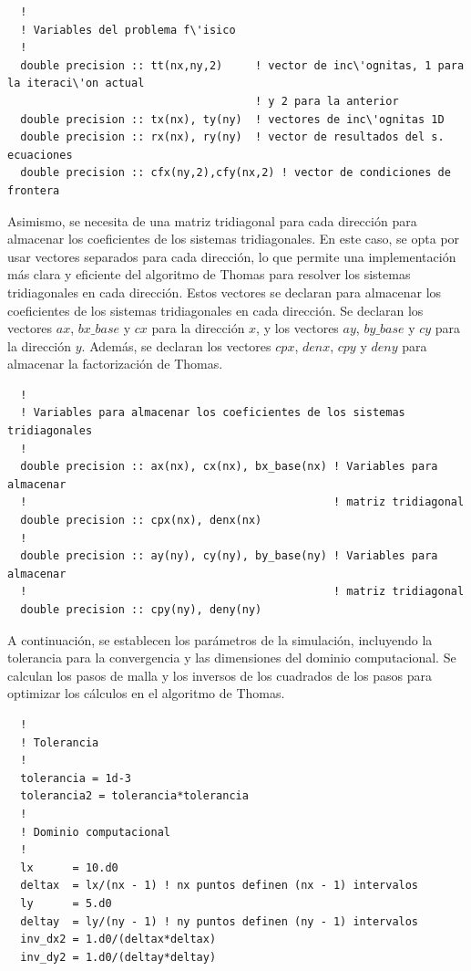 \documentclass[11pt,a4paper]{article}
\begin{document}
\begin{verbatim}
  !
  ! Variables del problema f\'isico
  !
  double precision :: tt(nx,ny,2)     ! vector de inc\'ognitas, 1 para la iteraci\'on actual 
                                      ! y 2 para la anterior
  double precision :: tx(nx), ty(ny)  ! vectores de inc\'ognitas 1D
  double precision :: rx(nx), ry(ny)  ! vector de resultados del s. ecuaciones
  double precision :: cfx(ny,2),cfy(nx,2) ! vector de condiciones de frontera
\end{verbatim}

Asimismo, se necesita de una matriz tridiagonal para cada direcci\'on
para almacenar los coeficientes de los sistemas tridiagonales. En este caso, se opta por usar 
vectores separados para cada dirección, lo que permite una implementación más 
clara y eficiente del algoritmo de Thomas para resolver los sistemas 
tridiagonales en cada dirección. Estos vectores se declaran para
almacenar los coeficientes de los sistemas tridiagonales en cada dirección. 
Se declaran los vectores $ax$, $bx\_base$ y $cx$ para la dirección $x$, y los 
vectores $ay$, $by\_base$ y $cy$ para la dirección $y$. Además, se declaran los 
vectores $cpx$, $denx$, $cpy$ y $deny$ para almacenar la factorización de Thomas.

\begin{verbatim}
  !
  ! Variables para almacenar los coeficientes de los sistemas tridiagonales
  !
  double precision :: ax(nx), cx(nx), bx_base(nx) ! Variables para almacenar
  !                                               ! matriz tridiagonal
  double precision :: cpx(nx), denx(nx)
  !
  double precision :: ay(ny), cy(ny), by_base(ny) ! Variables para almacenar
  !                                               ! matriz tridiagonal
  double precision :: cpy(ny), deny(ny)
\end{verbatim}

A continuación, se establecen los parámetros de la simulación, incluyendo la 
tolerancia para la convergencia y las dimensiones del dominio computacional. 
Se calculan los pasos de malla y los inversos de los cuadrados de los pasos 
para optimizar los cálculos en el algoritmo de Thomas.

\begin{verbatim}
  !
  ! Tolerancia
  !
  tolerancia = 1d-3
  tolerancia2 = tolerancia*tolerancia
  !
  ! Dominio computacional
  !
  lx      = 10.d0
  deltax  = lx/(nx - 1) ! nx puntos definen (nx - 1) intervalos
  ly      = 5.d0
  deltay  = ly/(ny - 1) ! ny puntos definen (ny - 1) intervalos
  inv_dx2 = 1.d0/(deltax*deltax)
  inv_dy2 = 1.d0/(deltay*deltay)
\end{verbatim}
\end{document}
